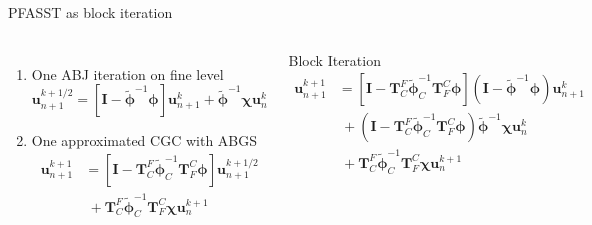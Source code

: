 \documentclass[11pt,aspectratio=43]{beamer}
\newcommand{\matr}[1]{\mathbf{#1}}
\newcommand{\vect}[1]{\boldsymbol{#1}}
\newcommand{\uvect}{\vect{u}}
\newcommand{\TFtoC}{\matr{T}_F^C}
\newcommand{\TCtoF}{\matr{T}_C^F}
\newcommand{\eyeMat}{\matr{I}}
\newcommand{\phiOp}{\bm{\phi}}
\newcommand{\chiOp}{\bm{\chi}}
\newcommand{\phiApprox}{\bm{\tilde{\phi}}}
\newcommand{\CoarseId}{C}
\newcommand{\phiApproxCoarse}{\bm{\tilde{\phi}}_\CoarseId}
\begin{document}
\begin{frame}{PFASST as block iteration}
	\begin{columns}
		\begin{enumerate}
			\item One ABJ iteration on fine level
			$$\vect{u}_{n+1}^{k+1/2} = \left[\matr{I} - \tilde{\bm{\phi}}^{-1} \bm{\phi}\right] \vect{u}_{n+1}^{k} +
			\tilde{\bm{\phi}}^{-1}\bm{\chi}\vect{u}_{n}^{k}$$
			\item One approximated CGC with ABGS
			\begin{equation*}
				\begin{split}
					\vect{u}_{n+1}^{k+1} 
					&= \left[\matr{I} - \TCtoF\phiApproxCoarse^{-1}\TFtoC\phiOp\right] \vect{u}_{n+1}^{k+1/2} \\
					&~+ \TCtoF\phiApproxCoarse^{-1}\TFtoC\bm{\chi}\vect{u}_{n}^{k+1}
				\end{split}
			\end{equation*}
		\end{enumerate}\vspace{-10pt}
		\begin{block}{Block Iteration}\vskip-10pt
			\begin{equation*}
				\begin{split}
					\uvect_{n+1}^{k+1} &=
					[\eyeMat - \TCtoF\phiApproxCoarse^{-1}\TFtoC \phiOp]
					(\eyeMat - \phiApprox^{-1} \phiOp)\uvect_{n+1}^k \\
					&~+ (\eyeMat - \TCtoF\phiApproxCoarse^{-1}\TFtoC \phiOp)
					\phiApprox^{-1}\chiOp\uvect_{n}^k\\
					&~+ \TCtoF\phiApproxCoarse^{-1}\TFtoC\chiOp\uvect_{n}^{k+1}
				\end{split}
			\end{equation*}
		\end{block}
		

\end{columns}
\end{frame}
\end{document}
